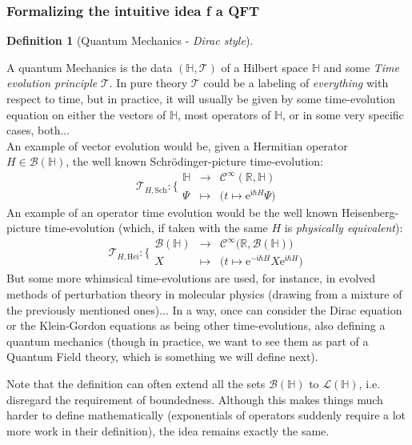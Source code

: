 \documentclass[a4paper,11pt]{article}
\numberwithin{equation}{section}
\theoremstyle{definition}
\newtheorem{definition}{Definition}
\newcommand{\e}{{\mathrm{e}}}
\begin{document}
\subsubsection{Formalizing the intuitive idea f a QFT}
\begin{definition}[Quantum Mechanics - \emph{Dirac style}]$\quad$

A quantum Mechanics is the data $(\mathbb{H},\mathcal{T})$ of a Hilbert space $\mathbb{H}$ and some \emph{Time evolution principle} $\mathcal{T}$. In pure theory $\mathcal{T}$ could be a labeling of \emph{everything} with respect to time, but in practice, it will usually be given by some time-evolution equation on either the vectors of $\mathbb{H}$, most operators of $\mathbb{H}$, or in some very specific cases, both...\\
An example of vector evolution would be, given a Hermitian operator $H\in\mathcal{B}(\mathbb{H})$, the well known Schrödinger-picture time-evolution:
$$\boxed{\mathcal{T}_{H,\mathrm{Sch}}: \Bigg\{
\begin{matrix}
\mathbb{H} & \to & \mathcal{C}^\infty(\mathbb{R},\mathbb{H})\\
\Psi & \mapsto & \Big(t\mapsto \e^{\mathfrak{i}\hbar H}\Psi\Big)
\end{matrix}}$$
An example of an operator time evolution would be the well known Heisenberg-picture time-evolution (which, if taken with the same $H$ is \emph{physically equivalent}):
$$\boxed{\mathcal{T}_{H,\mathrm{Hei}}: \Bigg\{
\begin{matrix}
\mathcal{B}(\mathbb{H}) & \to & \mathcal{C}^\infty\big(\mathbb{R},\mathcal{B}(\mathbb{H})\big)\\
X & \mapsto & \Big(t\mapsto \e^{-\mathfrak{i}\hbar H}X\e^{\mathfrak{i}\hbar H}\Big)
\end{matrix}}$$
But some more whimsical time-evolutions are used, for instance, in evolved methods of perturbation theory in molecular physics (drawing from a mixture of the previously mentioned ones)... In a way, once can consider the Dirac equation or the Klein-Gordon equations as being other time-evolutions, also defining a quantum mechanics (though in practice, we want to see them as part of a Quantum Field theory, which is something we will define next).

Note that the definition can often extend all the sets $\mathcal{B}(\mathbb{H})$ to $\mathcal{L}(\mathbb{H})$, i.e. disregard the requirement of boundedness. Although this makes things much harder to define mathematically (exponentials of operators suddenly require a lot more work in their definition), the idea remains exactly the same.
\end{definition}
\end{document}
